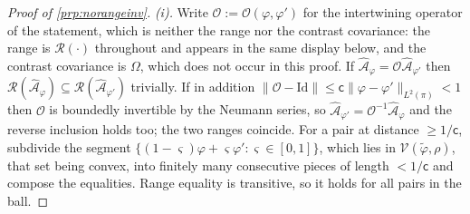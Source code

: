 \begin{proof}[Proof of \cref{prp:norangeinv}]
\emph{(i).} Write $\mathcal O:=\mathcal O(\varphi,\varphi')$ for the intertwining operator of the
statement, which is neither the range nor the contrast covariance: the range is $\mathcal R(\cdot)$
throughout and appears in the same display below, and the contrast covariance is $\Omega$, which does
not occur in this proof.
If $\hat{\mathcal A}_\varphi=\mathcal O\hat{\mathcal A}_{\varphi'}$ then
$\mathcal R(\hat{\mathcal A}_\varphi)\subseteq\mathcal R(\hat{\mathcal A}_{\varphi'})$ trivially. If in
addition $\|\mathcal O-\mathrm{Id}\|\le\mathsf c\|\varphi-\varphi'\|_{L^{2}(\pi)}<1$ then $\mathcal O$ is
boundedly invertible by the Neumann series, so
$\hat{\mathcal A}_{\varphi'}=\mathcal O^{-1}\hat{\mathcal A}_\varphi$ and the reverse inclusion
holds too; the two ranges coincide. For a pair at distance $\ge1/\mathsf c$, subdivide the segment
$\{(1-\varsigma)\varphi+\varsigma\varphi':\varsigma\in[0,1]\}$, which lies in
$\mathcal V(\tilde\varphi,\rho)$, that set being convex, into finitely many consecutive pieces of
length $<1/\mathsf c$ and compose the equalities. Range equality is transitive, so it holds for all
pairs in the ball.


\end{proof}

